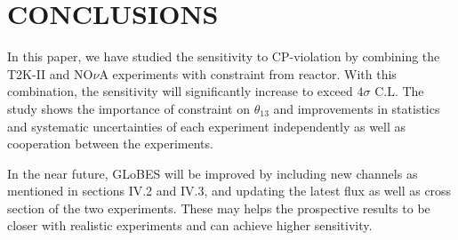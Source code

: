 \documentclass[a4 paper,12pt]{report}%
\def\Mr{\uppercase}
\begin{document}
\section{\Mr{Conclusions}}
In this paper, we have studied the sensitivity to CP-violation by combining the T2K-II and NO$\nu$A experiments with constraint from reactor. With this combination, the sensitivity will significantly increase to exceed $4\sigma$ C.L. The study shows the importance of constraint on $\theta_{13}$ and improvements in statistics and systematic uncertainties of each experiment independently as well as cooperation between the experiments.\par 
In the near future, GLoBES will be improved by including new channels as mentioned in sections IV.2 and IV.3, and updating the latest flux as well as cross section of the two experiments. These may helps the prospective results to be closer with realistic experiments and can achieve higher sensitivity.\par 
\end{document}
